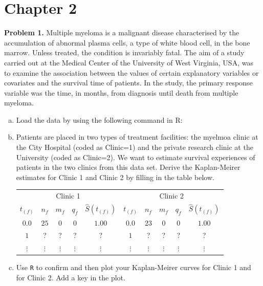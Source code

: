 \documentclass[12pt]{article}
\begin{document}
\section{Chapter 2}

\textbf{Problem 1.} Multiple myeloma is a malignant disease characterised by the accumulation
of abnormal plasma cells, a type of white blood cell, in the bone marrow. Unless
treated, the condition is invariably fatal. The aim of a study carried out at
the Medical Center of the University of West Virginia, USA, was to examine the association between the values of certain explanatory variables or covariates and the survival time of patients. In the study, the primary response
variable was the time, in months, from diagnosis until death from multiple
myeloma.
\begin{enumerate}[(a)]
\item Load the data by using the following command in R:

\bigotimes

\item Patients are placed in  two types of treatment facilities: the myelmoa clinic at the City Hospital (coded as Clinic=1) and the private research clinic at the University (coded as Clinic=2). We want to estimate survival experiences of patients in the two clinics from this data set. Derive the Kaplan-Meirer estimates for Clinic 1 and Clinic 2 by filling in the table below.

\begin{center}
\begin{tabular}{ c c c c c | c c c c c }
 \multicolumn{5}{c}{Clinic 1} & \multicolumn{5}{c}{Clinic 2} \\

 $t_{(f)}$ & $n_f$ & $m_{f}$ & $q_{f}$ & $\hat{S}(t_{(f)})$   & $t_{(f)}$ & $n_f$ & $m_{f}$ & $q_{f}$ & $\hat{S}(t_{(f)})$ \\

 \hline

 $0.0$ & $25$ & $0$ & $0$ & $1.00$    & $0.0$ & $23$ & $0$ & $0$ & $1.00$ \\

 $1$ & ? & ? & ? & ?    & $1$ & ? & ? & ? & ? \\

 $\vdots$ & $\vdots$ & $\vdots$ & $\vdots$ & $\vdots$    & $\vdots$ & $\vdots$ & $\vdots$ & $\vdots$ & $\vdots$
\end{tabular}
\end{center}

\item Use \lstinline{R} to confirm and then plot your Kaplan-Meirer curves for Clinic 1 and for Clinic 2. Add a key in the plot.


\end{enumerate}
\end{document}
